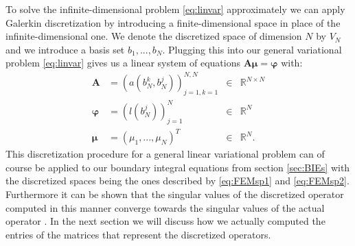 \documentclass[a4paper, oneside]{thirdparty_stylesheets/discothesis}
\begin{document}
To solve the infinite-dimensional problem \ref{eq:linvar} approximately we can apply Galerkin discretization by introducing a finite-dimensional space in place of the infinite-dimensional one.
We denote the discretized space of dimension $N$ by $V_N$ and we introduce a basis set ${b_1,...,b_N}$.
Plugging this into our general variational problem \ref{eq:linvar} gives us a linear system of equations $\mathbf{A}\boldsymbol{\mu} = \boldsymbol{\varphi}$ with:
\begin{align}
	\mathbf{A} &= \left(a(b_N^k,b_{N}^j) \right)_{j=1,k=1}^{N,N} &\in& \mathbb{R}^{N\times N} \\
	\boldsymbol{\varphi} &= \left( l(b_N^j)\right)_{j=1}^{N} &\in& \mathbb{R}^{N} \\
	\boldsymbol{\mu} &= (\mu_1,...,\mu_N)^T &\in& \mathbb{R}^N. \label{mu}
\end{align}
This discretization procedure for a general linear variational problem can of course be applied to our boundary integral equations from section \ref{sec:BIEs} with the discretized spaces being the ones described by \ref{eq:FEMsp1} and \ref{eq:FEMsp2}.
Furthermore it can be shown that the singular values of the discretized operator computed in this manner converge towards the singular values of the actual operator \cite{svdap}.
In the next section we will discuss how we actually computed the entries of the matrices that represent the discretized operators.
\end{document}
